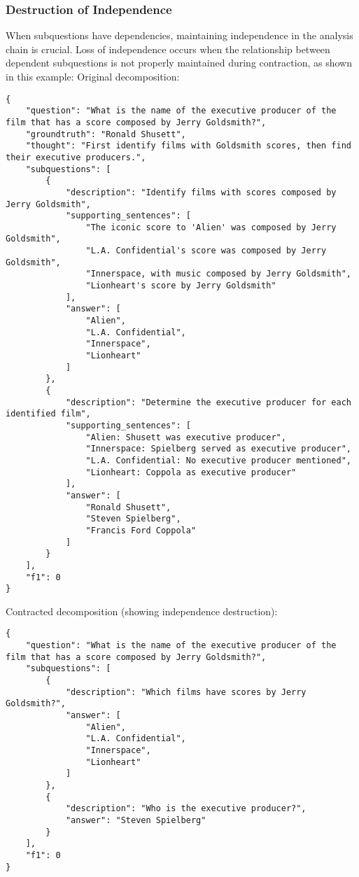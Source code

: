 \subsubsection*{Destruction of Independence}
When subquestions have dependencies, maintaining independence in the analysis chain is crucial. Loss of independence occurs when the relationship between dependent subquestions is not properly maintained during contraction, as shown in this example:
Original decomposition:
\begin{lstlisting}[style=PythonStyle, caption={Destruction of Independence Example}]
{
    "question": "What is the name of the executive producer of the film that has a score composed by Jerry Goldsmith?",
    "groundtruth": "Ronald Shusett",
    "thought": "First identify films with Goldsmith scores, then find their executive producers.",
    "subquestions": [
        {
            "description": "Identify films with scores composed by Jerry Goldsmith",
            "supporting_sentences": [
                "The iconic score to 'Alien' was composed by Jerry Goldsmith",
                "L.A. Confidential's score was composed by Jerry Goldsmith",
                "Innerspace, with music composed by Jerry Goldsmith",
                "Lionheart's score by Jerry Goldsmith"
            ],
            "answer": [
                "Alien",
                "L.A. Confidential", 
                "Innerspace",
                "Lionheart"
            ]
        },
        {
            "description": "Determine the executive producer for each identified film",
            "supporting_sentences": [
                "Alien: Shusett was executive producer",
                "Innerspace: Spielberg served as executive producer",
                "L.A. Confidential: No executive producer mentioned",
                "Lionheart: Coppola as executive producer"
            ],
            "answer": [
                "Ronald Shusett",
                "Steven Spielberg",
                "Francis Ford Coppola"
            ]
        }
    ],
    "f1": 0
}
\end{lstlisting}
Contracted decomposition (showing independence destruction):
\begin{lstlisting}[style=PythonStyle, caption={Destruction of Independence Example}]
{
    "question": "What is the name of the executive producer of the film that has a score composed by Jerry Goldsmith?",
    "subquestions": [
        {
            "description": "Which films have scores by Jerry Goldsmith?",
            "answer": [
                "Alien",
                "L.A. Confidential",
                "Innerspace",
                "Lionheart"
            ]
        },
        {
            "description": "Who is the executive producer?",
            "answer": "Steven Spielberg"
        }
    ],
    "f1": 0
}
\end{lstlisting}
